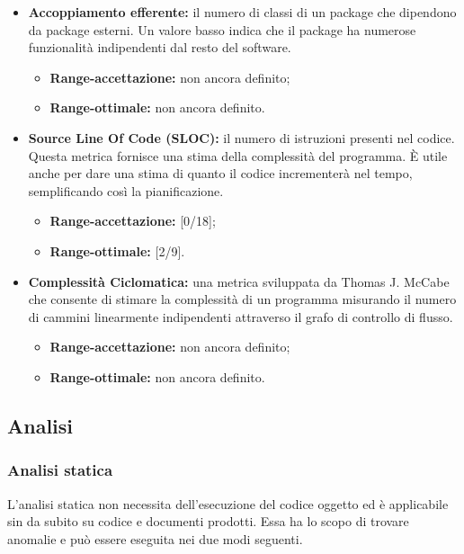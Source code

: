 \begin{itemize}
			\item \textbf{Accoppiamento efferente: }il numero di classi di un package che dipendono da package esterni. Un valore basso indica che il package ha numerose funzionalità indipendenti dal resto del software.
			
			\begin{itemize}
				\item \textbf{Range-accettazione: }non ancora definito;
				\item \textbf{Range-ottimale: }non ancora definito.
			\end{itemize}
			
			\item \textbf{Source Line Of Code (SLOC): }il numero di istruzioni presenti nel codice. Questa metrica fornisce una stima della complessità del programma. È utile anche per dare una stima di quanto il codice incrementerà nel tempo, semplificando così la pianificazione.
			
			\begin{itemize}
				\item \textbf{Range-accettazione: }[0/18];
				\item \textbf{Range-ottimale: }[2/9].
			\end{itemize}
			
			\item \textbf{Complessità Ciclomatica: }una metrica sviluppata da Thomas J. McCabe che consente di stimare la complessità di un programma misurando il numero di cammini linearmente indipendenti attraverso il grafo di controllo di flusso.
			
			\begin{itemize}
				\item \textbf{Range-accettazione: }non ancora definito;
				\item \textbf{Range-ottimale: }non ancora definito.
			\end{itemize}
			
			
		
		\end{itemize}
		
		
	\subsection{Analisi}
	
		\subsubsection{Analisi statica}
		L'analisi statica non necessita dell'esecuzione del codice oggetto ed è applicabile sin da subito su codice e documenti prodotti. Essa ha lo scopo di trovare anomalie e può essere eseguita nei due modi seguenti.
		
